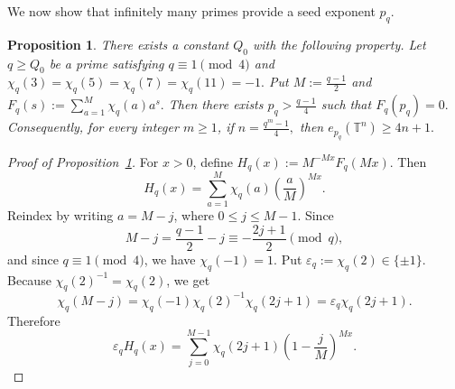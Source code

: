 \documentclass[11pt]{article}
\newtheorem{prop}[theorem]{Proposition}
\theoremstyle{definition}
\newcommand{\T}{\mathbb T}
\begin{document}
We now show that infinitely many primes provide a seed exponent \(p_q\).

\begin{prop}\label{prop:four-legendre-large-root}
There exists a constant \(Q_0\) with the following property. Let \(q\ge Q_0\) be
a prime satisfying
\(
q\equiv1\pmod4\) and
\(
\chi_q(3)=\chi_q(5)=\chi_q(7)=\chi_q(11)=-1.
\)
Put
\(
M:=\frac{q-1}{2}
\)
and
\(
F_q(s):=\sum_{a=1}^{M}\chi_q(a)a^s.
\)
Then there exists
\(
p_q>\frac{q-1}{4}
\)
such that
\(
F_q(p_q)=0.
\)
Consequently, for every integer \(m\ge1\), if
\(
n=\frac{q^m-1}{4},
\)
then
\(
e_{p_q}(\T^n)\ge4n+1.
\)
\end{prop}
\begin{proof}[Proof of Proposition~\ref{prop:four-legendre-large-root}]
For \(x>0\), define
\(
H_q(x):=M^{-Mx}F_q(Mx).
\)
Then
\[
H_q(x)=\sum_{a=1}^{M}\chi_q(a)\left(\frac{a}{M}\right)^{Mx}.
\]
Reindex by writing \(a=M-j\), where \(0\le j\le M-1\). Since
\[
M-j=\frac{q-1}{2}-j\equiv-\frac{2j+1}{2}\pmod q,
\]
and since \(q\equiv1\pmod4\), we have \(\chi_q(-1)=1\). Put
\(
\varepsilon_q:=\chi_q(2)\in\{\pm1\}.
\)
Because \(\chi_q(2)^{-1}=\chi_q(2)\), we get
\[
\chi_q(M-j)
=
\chi_q(-1)\chi_q(2)^{-1}\chi_q(2j+1)
=
\varepsilon_q\chi_q(2j+1).
\]
Therefore
\[
\varepsilon_q H_q(x)
=
\sum_{j=0}^{M-1}\chi_q(2j+1)
\left(1-\frac{j}{M}\right)^{Mx}.
\]


\end{proof}
\end{document}

